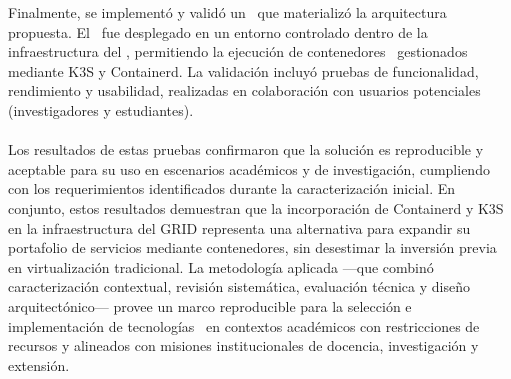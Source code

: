 \noindent
Finalmente, se implementó y validó un \PMV\ que materializó la arquitectura propuesta. El \PMV\ fue desplegado en un entorno controlado dentro de la infraestructura del \GRID, permitiendo la ejecución de contenedores \OCI\ gestionados mediante K3S y Containerd. La validación incluyó pruebas de funcionalidad, rendimiento y usabilidad, realizadas en colaboración con usuarios potenciales (investigadores y estudiantes). \\ \\
\noindent
Los resultados de estas pruebas confirmaron que la solución es reproducible y aceptable para su uso en escenarios académicos y de investigación, cumpliendo con los requerimientos identificados durante la caracterización inicial. En conjunto, estos resultados demuestran que la incorporación de Containerd y K3S en la infraestructura del GRID representa una alternativa para expandir su portafolio de servicios mediante contenedores, sin desestimar la inversión previa en virtualización tradicional. La metodología aplicada —que combinó caracterización contextual, revisión sistemática, evaluación técnica y diseño arquitectónico— provee un marco reproducible para la selección e implementación de tecnologías \VBC\ en contextos académicos con restricciones de recursos y alineados con misiones institucionales de docencia, investigación y extensión.